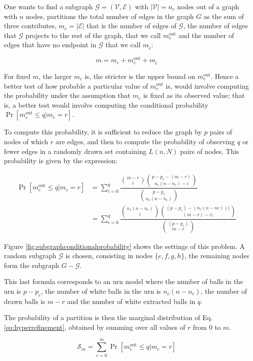 One wants to find a subgraph $\mathcal{G}=(\mathcal{V},\mathcal{E})$ with $|\mathcal{V}|=n_c$ nodes out of a graph with $n$ nodes, partitions the total number of edges in the graph $G$ as the sum of three contributes, $m_c=|\mathcal{E}|$ that is the number of edges of $\mathcal{G}$, the number of edges that $\mathcal{G}$ projects to the rest of the graph, that we call $m^{\textrm{out}}_c$ and the number of edges that have no endpoint in $\mathcal{G}$ that we call $m_{\tilde{c}}$:

\begin{equation}
m = m_c + m^{\textrm{out}}_c + m_{\tilde{c}}
\end{equation}

For fixed $m$, the larger $m_c$ is, the stricter is the upper bound on $m^{\textrm{out}}_c$. Hence a better test of how probable a particular value of $m^{\textrm{out}}_c$ is, would involve computing the probability under the assumption that $m_c$ is fixed as its observed value; that is, a better test would involve computing the conditional probability $\Pr[m^{\textrm{out}}_c \leq q | m_c =r]$.

To compute this probability, it is sufficient to reduce the graph by $p$ pairs of nodes of which $r$ are edges, and then to compute the probability of observing $q$ or fewer edges in a randomly drawn set containing $L(n,N)$ pairs of nodes. This probability is given by the expression:

\begin{align}\label{eq:hyperrefinement}
\Pr[m^{\textrm{out}}_c \leq q | m_c =r] &= \sum \limits_{i=0}^{q} \dfrac{\binom{m-r}{i} \binom{p-p_c - (m-r)}{n_c(n-n_c) - i}}{\binom{p-p_c}{n_c(n-n_c)}} \\
&=  \sum \limits_{i=0}^{q} \dfrac{\binom{n_c(n-n_c)}{i}\binom{(p-p_c)-(n_c(n-nc)))}{(m-r)-i)}}{\binom{(p-p_c)}{m-r}}
\end{align}


Figure \ref{fig:subgraphconditionalprobability} shows the settings of this problem. A random subgraph $\mathcal{G}$ is chosen, consisting in nodes $\{e,f,g,h\}$, the remaining nodes form the subgraph $G-\mathcal{G}$.



This last formula corresponds to an urn model where the number of balls in the urn is $p-p_c$, the number of white balls in the urn is $n_c(n-n_c)$, the number of drawn balls is $m-r$ and the number of white extracted balls in $q$.

The probability of a partition is then the marginal distribution of Eq. \ref{eq:hyperrefinement}, obtained by summing over all values of $r$ from $0$ to $m$.

\begin{equation}
\mathcal{S}_m =  \sum \limits_{r=0}^m \Pr[m^{\textrm{out}}_c \leq q | m_c =r]
\end{equation}
